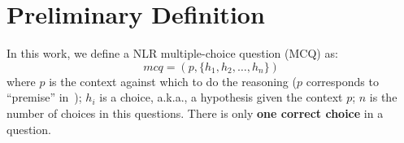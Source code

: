 \section{Preliminary Definition}
\label{sec:prelim}
In this work, we define a NLR multiple-choice question (MCQ) as: 
\begin{equation}
mcq = (p, \{h_1, h_2, \ldots, h_n\}) 
\label{eq:nli}
\end{equation}
\noindent
where $p$ is the context against which to do the reasoning ($p$ corresponds 
to ``premise'' in~);
$h_i$ is a choice, a.k.a., a hypothesis given the context $p$; 
$n$ is the number of choices in this questions. There is only \textbf{one
correct choice} in a question.

 


